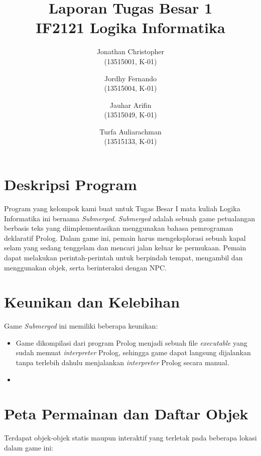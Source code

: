 \documentclass[a4paper,titlepage]{article}
\begin{document}
	\title{Laporan Tugas Besar 1 \\ IF2121 Logika Informatika}
	\author{
			Jonathan Christopher \\
			(13515001, K-01)
		\and
			Jordhy Fernando \\
			(13515004, K-01)
		\and
			Jauhar Arifin \\
			(13515049, K-01)
		\and
			Turfa Auliarachman \\
			(13515133, K-01)
	}
	\maketitle

	\section{Deskripsi Program}

		Program yang kelompok kami buat untuk Tugas Besar I mata kuliah Logika Informatika ini bernama \textit{Submerged}. \textit{Submerged} adalah sebuah game petualangan berbasis teks yang diimplementasikan menggunakan bahasa pemrograman deklaratif Prolog. Dalam game ini, pemain harus mengeksplorasi sebuah kapal selam yang sedang tenggelam dan mencari jalan keluar ke permukaan. Pemain dapat melakukan perintah-perintah untuk berpindah tempat, mengambil dan menggunakan objek, serta berinteraksi dengan NPC.

	\section{Keunikan dan Kelebihan}

		Game \textit{Submerged} ini memiliki beberapa keunikan:

		\begin{itemize}
			\item Game dikompilasi dari program Prolog menjadi sebuah file \textit{executable} yang sudah memuat \textit{interpreter} Prolog, sehingga game dapat langsung dijalankan tanpa terlebih dahulu menjalankan \textit{interpreter} Prolog secara manual.
			\item 
		\end{itemize}

	\section{Peta Permainan dan Daftar Objek}

		\noindent Terdapat objek-objek statis maupun interaktif yang terletak pada beberapa lokasi dalam game ini:
\end{document}
